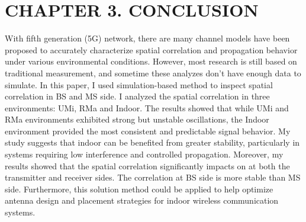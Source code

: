 \documentclass{article} %
\begin{document}
\section*{CHAPTER 3. CONCLUSION}
With fifth generation (5G) network, there are many channel models have been proposed to accurately characterize spatial correlation and propagation behavior under various environmental conditions. However, most research is still based on traditional measurement, and sometime these analyzes don’t have enough data to simulate. In this paper, I used simulation-based method to inspect spatial correlation in BS and MS side. I analyzed the spatial correlation in three environments: UMi, RMa and Indoor. The results showed that while UMi and RMa environments exhibited strong but unstable oscillations, the Indoor environment provided the most consistent and predictable signal behavior. My study suggests that indoor can be benefited from greater stability, particularly in systems requiring low interference and controlled propagation. Moreover, my results showed that the spatial correlation significantly impacts on at both the transmitter and receiver sides. The correlation at BS side is more stable than MS side. Furthermore, this solution method could be applied to help optimize antenna design and placement strategies for indoor wireless communication systems.

\clearpage



\end{document}
